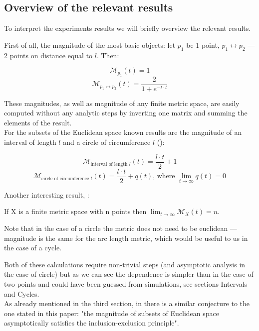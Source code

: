 \documentclass{article}
\begin{document}
\subsection{Overview of the relevant results}

To interpret the experiments results we will briefly overview the relevant
results.

First of all, the magnitude of the most basic objects: let $p_1$ be 1 point, $p_1\leftrightarrow p_2$ --- 2 points on distance equal to $l$. Then:

$$\mathcal{M}_{p_1}(t) = 1$$
$$\mathcal{M}_{p_1\leftrightarrow p_2}(t) = \frac{2}{1 + e^{-t \cdot l}}$$

These magnitudes, as well as magnitude of any finite metric space, are easily computed
without any analytic steps by inverting one matrix and summing the elements
of the result.
\\

For the subsets of the Euclidean space known results
are the magnitude of an interval of length $l$ and a circle of circumference $l$ (\textcite{Leinster_2012}):

$$\mathcal{M}_{\text{interval of length $l$}}(t) = \frac{l \cdot t}{2} + 1$$
$$\mathcal{M}_{\text{circle of circumference $l$}}(t) = \frac{l \cdot t}{2} + q(t) \text{, where } \lim_{t \rightarrow \infty} q(t) = 0$$

Another interesting result, \textcite{Leinster_2012}:

\begin{theorem}
    If X is a finite metric space with n points then $\lim_{t \rightarrow \infty} \mathcal{M}_X(t) = n$.
\end{theorem}
 

Note that in the case of a circle the metric does not need to be euclidean --- magnitude is the same
for the arc length metric, which would be useful to us in the case of a cycle.


Both of these calculations require non-trivial steps (and asymptotic analysis in the case of circle)
but as we can see the dependence is simpler than in the case of two points and could have been guessed from simulations,
see sections Intervals and Cycles.
\\

As already mentioned in the third section, in \textcite{Leinster_2012} there is
a similar conjecture to the one stated in this paper: "the magnitude of subsets of
Euclidean space asymptotically satisfies the inclusion-exclusion principle". \\
\end{document}

